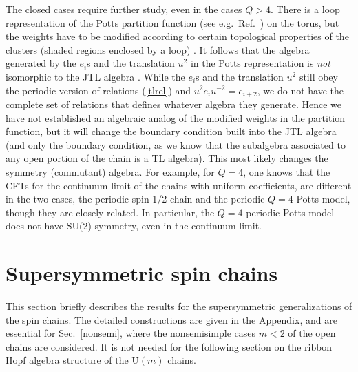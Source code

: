 \documentclass[twocolumn,floats,pra]{revtex4}
\begin{document}
The closed cases require further study, even in the cases $Q>4$.
There is a loop representation of the Potts partition function
(see e.g.\ Ref.\ \cite{baxter}) on the torus, but the weights have
to be modified according to certain topological properties of the
clusters (shaded regions enclosed by a loop) \cite{dfsz}. It
follows that the algebra generated by the $e_i$s and the
translation $u^2$ in the Potts representation is {\em not}
isomorphic to the JTL algebra \cite{ms1,ms2}. While the $e_i$s and
the translation $u^2$ still obey the periodic version of relations
(\ref{tlrel}) and $u^2e_iu^{-2}=e_{i+2}$, we do not have the
complete set of relations that defines whatever algebra they
generate. Hence we have not established an algebraic analog of the
modified weights in the partition function, but it will change the
boundary condition built into the JTL algebra (and only the
boundary condition, as we know that the subalgebra associated to
any open portion of the chain is a TL algebra). This most likely
changes the symmetry (commutant) algebra. For example, for $Q=4$,
one knows that the CFTs for the continuum limit of the chains with
uniform coefficients, are different in the two cases, the periodic
spin-1/2 chain and the periodic $Q=4$ Potts model, though they are
closely related. In particular, the $Q=4$ periodic Potts model
does not have SU(2) symmetry, even in the continuum limit.



\section{Supersymmetric spin chains}
\label{susych}

This section briefly describes the results for the supersymmetric
generalizations of the spin chains. The detailed constructions are
given in the Appendix, and are essential for Sec.\ \ref{nonsemi},
where the nonsemisimple cases $m<2$ of the open chains are
considered. It is not needed for the following section on the
ribbon Hopf algebra structure of the U$(m)$ chains.
\end{document}
